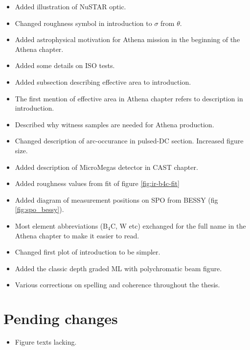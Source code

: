 \begin{itemize}
  \item Added illustration of NuSTAR optic.
  \item Changed roughness symbol in introduction to $\sigma$ from $\theta$.
  \item Added astrophysical motivation for Athena mission in the beginning of the Athena chapter.
  \item Added some details on ISO tests.
  \item Added subsection describing effective area to introduction.
  \item The first mention of effective area in Athena chapter refers to description in introduction.
  \item Described why witness samples are needed for Athena production.
  \item Changed description of arc-occurance in pulsed-DC section. Increased figure size.
  \item Added description of MicroMegas detector in CAST chapter.
  \item Added roughness values from fit of figure \ref{fig:ir-b4c-fit}
  \item Added diagram of measurement positions on SPO from BESSY (fig \ref{fig:spo_bessy}).
  \item Most element abbreviations (B$_4$C, W etc) exchanged for the full name in the Athena chapter to make it easier to read.
  \item Changed first plot of introduction to be simpler.
  \item Added the classic depth graded ML with polychromatic beam figure.

  \item Various corrections on spelling and coherence throughout the thesis.
\end{itemize}

\section{Pending changes}
\begin{itemize}
\item Figure texts lacking.
\end{itemize}
